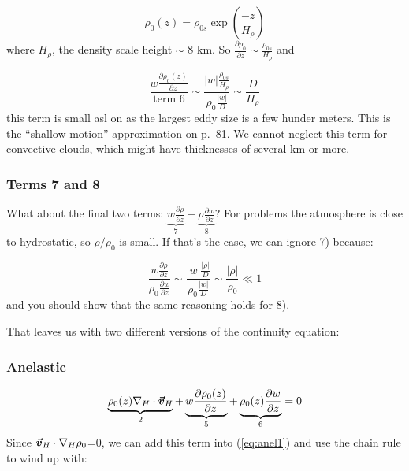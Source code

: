 \documentclass[12pt]{article}
\begin{document}
\begin{equation}
  \label{eq:hydrodens}
  \rho_0 (z) = \rho_{0s} \exp \left ( \frac{-z }{H_\rho} \right )
\end{equation}
where $H_\rho$, the density scale height $\sim$ 8 km.  So 
$\frac{\partial \rho_0 }{\partial z}  \sim \frac{\rho_{0s} }{H_\rho}$
and

\begin{equation}
  \label{eq:term5}
 \frac{w \frac{\partial \rho_0(z) }{\partial z} }{\text{term 6}}   \sim \frac{|w| 
\frac{\rho_{0s} }{H_\rho}  }{\rho_0 \frac{ |w|}{D}  } \sim \frac{ D}{H_\rho} 
\end{equation}
this term is small asl on as the largest eddy size is a few hunder meters.
This is the ``shallow motion'' approximation on p.~81.
We cannot neglect this term for convective clouds, which might have thicknesses
of several km or more.  


\subsubsection{Terms 7 and 8}
\label{sec:terms-7-8}


What about the final two terms:  $\underbrace{w \frac{\partial \rho }{\partial z}  }_7 +
\underbrace{\rho \frac{\partial w }{\partial z}}_8 $?  For problems the atmosphere is
close to hydrostatic, so $\rho/\rho_0$ is small.  If that's the case,
we can ignore 7) because:

\begin{equation}
  \label{eq:term7}
  \frac{ w \frac{\partial \rho }{\partial z} }{\rho_0 \frac{ \partial w}{\partial z}} \sim \frac{ |w|\frac{ |\rho|}{D} }{\rho_0 \frac{|w| }{D} }  
\sim \frac{ |\rho|}{\rho_0}  \ll 1
\end{equation}
and you should show that the same reasoning holds for 8).


That leaves us with two different versions of the continuity equation:

\subsubsection{Anelastic}
\label{sec:anelastic}

\begin{equation}
  \label{eq:anel1}
  \underbrace{\rho_0(z) \nabla_H \cdot \boldsymbol{\vec{v}}_H}_2 + 
\underbrace{w \frac{\partial \rho_0(z) }{\partial z}}_5 +
\underbrace{\rho_0(z) \frac{\partial w }{\partial z}}_6 =0
\end{equation}
Since $\boldsymbol{\vec{v}}_H \cdot \nabla_H \rho_0$=0, we can add this
term into (\ref{eq:anel1}) and use the chain rule to wind up
with:
\end{document}
